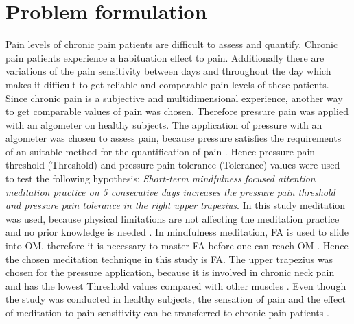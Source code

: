 \chapter{Problem formulation}

Pain levels of chronic pain patients are difficult to assess and quantify. Chronic pain patients experience a habituation effect to pain. Additionally there are variations of the pain sensitivity between days and throughout the day which makes it difficult to get reliable and comparable pain levels of these patients. Since chronic pain is a subjective and multidimensional experience, another way to get comparable values of pain was chosen. Therefore pressure pain was applied with an algometer on healthy subjects. The application of pressure with an algometer was chosen to assess pain, because pressure satisfies the requirements of an suitable method for the quantification of pain \cite{Keele1954}. Hence pressure pain threshold (Threshold) and pressure pain tolerance (Tolerance) values were used to test the following hypothesis:
\textit{Short-term mindfulness focused attention meditation practice on 5 consecutive days increases the pressure pain threshold and pressure pain tolerance in the right upper trapezius}. In this study meditation was used, because physical limitations are not affecting the meditation practice and no prior knowledge is needed \cite{Tang2017}. In mindfulness meditation, FA is used to slide into OM, therefore it is necessary to master FA before one can reach OM \cite{Zeidan2016, Kabat1982, Perlman2010}. Hence the chosen meditation technique in this study is FA. The upper trapezius was chosen for the pressure application, because it is involved in chronic neck pain and has the lowest Threshold values compared with other muscles \cite{Falla2004,Fischer1987}. Even though the study was conducted in healthy subjects, the sensation of pain and the effect of meditation to pain sensitivity can be transferred to chronic pain patients \cite{Kjogx2016}.



